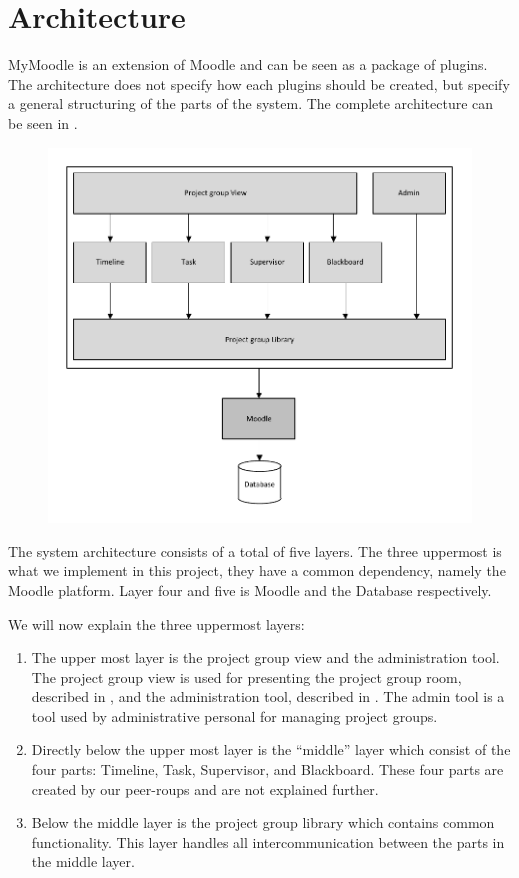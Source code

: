 \section{Architecture}
\label{sec:architecture}
MyMoodle is an extension of Moodle and can be seen as a package of plugins. 
The architecture does not specify how each plugins should be created, but specify a general structuring of the parts of the system. 
The complete architecture can be seen in .
\begin{figure}
	\centering
		\includegraphics{images/architecture.pdf}
	\label{fig:architecture}
\end{figure}

The system architecture consists of a total of five layers. 
The three uppermost is what we implement in this project, they have a common dependency, namely the Moodle platform. 
Layer four and five is Moodle and the Database respectively.

We will now explain the three uppermost layers:
\begin{enumerate}
	\item The upper most layer is the project group view and the administration tool. The project group view is used for presenting the project group room, described in , and the administration tool, described in . The admin tool is a tool used by administrative personal for managing project groups.
	\item Directly below the upper most layer is the ``middle'' layer which consist of the four parts: Timeline, Task, Supervisor, and Blackboard. These four parts are created by our peer-roups and are not explained further.
	\item Below the middle layer is the project group library which contains common functionality. This layer handles all intercommunication between the parts in the middle layer.  
\end{enumerate}


